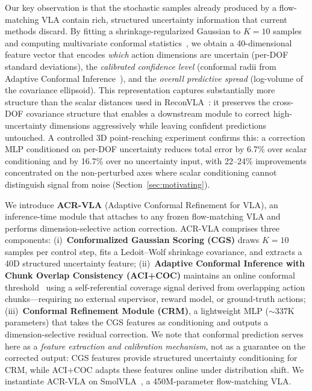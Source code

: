 Our key observation is that the stochastic samples already produced by a flow-matching VLA contain rich, structured uncertainty information that current methods discard.
By fitting a shrinkage-regularized Gaussian to $K{=}10$ samples and computing multivariate conformal statistics~\cite{braun2025cgs}, we obtain a 40-dimensional feature vector that encodes \emph{which} action dimensions are uncertain (per-DOF standard deviations), the \emph{calibrated confidence level} (conformal radii from Adaptive Conformal Inference~\cite{gibbs2021aci}), and the \emph{overall predictive spread} (log-volume of the covariance ellipsoid).
This representation captures substantially more structure than the scalar distances used in ReconVLA~\cite{chen2026reconvla}: it preserves the cross-DOF covariance structure that enables a downstream module to correct high-uncertainty dimensions aggressively while leaving confident predictions untouched.
A controlled 3D point-reaching experiment confirms this: a correction MLP conditioned on per-DOF uncertainty reduces total error by 6.7\% over scalar conditioning and by 16.7\% over no uncertainty input, with 22--24\% improvements concentrated on the non-perturbed axes where scalar conditioning cannot distinguish signal from noise (Section~\ref{sec:motivating}).

We introduce \textbf{ACR-VLA} (Adaptive Conformal Refinement for VLA), an inference-time module that attaches to any frozen flow-matching VLA and performs dimension-selective action correction.
ACR-VLA comprises three components:
(i)~\textbf{Conformalized Gaussian Scoring (CGS)} draws $K{=}10$ samples per control step, fits a Ledoit--Wolf shrinkage covariance, and extracts a 40D structured uncertainty feature;
(ii)~\textbf{Adaptive Conformal Inference with Chunk Overlap Consistency (ACI+COC)} maintains an online conformal threshold~\cite{gibbs2021aci} using a self-referential coverage signal derived from overlapping action chunks---requiring no external supervisor, reward model, or ground-truth actions;
(iii)~\textbf{Conformal Refinement Module (CRM)}, a lightweight MLP (${\sim}$337K parameters) that takes the CGS features as conditioning and outputs a dimension-selective residual correction.
We note that conformal prediction serves here as a \emph{feature extraction and calibration mechanism}, not as a guarantee on the corrected output: CGS features provide structured uncertainty conditioning for CRM, while ACI+COC adapts these features online under distribution shift.
We instantiate ACR-VLA on SmolVLA~\cite{shukor2025smolvla}, a 450M-parameter flow-matching VLA.


